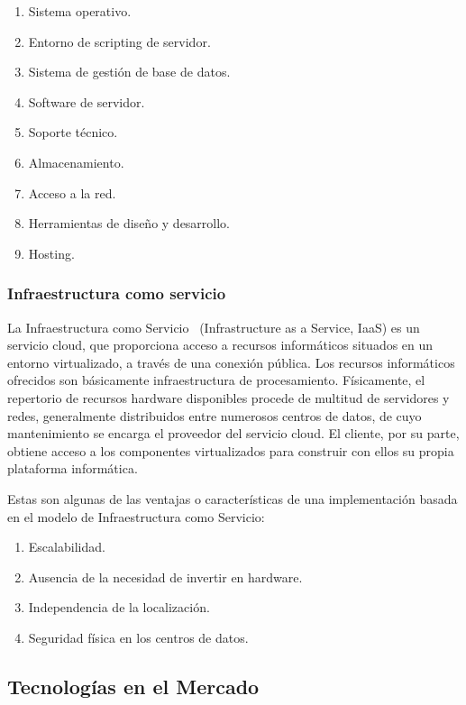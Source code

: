 \documentclass[a4paper,11pt]{book}
\begin{document}
\begin{enumerate}
\item Sistema operativo.
\item Entorno de scripting de servidor.
\item Sistema de gestión de base de datos.
\item Software de servidor.
\item Soporte técnico.
\item Almacenamiento.
\item Acceso a la red.
\item Herramientas de diseño y desarrollo.
\item Hosting.
\end{enumerate}

\subsubsection{Infraestructura como servicio}

La Infraestructura como Servicio~\cite{iaas} (Infrastructure as a Service, IaaS) es un servicio cloud, que proporciona acceso a recursos informáticos situados en un entorno virtualizado, a través de una conexión pública. Los recursos informáticos ofrecidos  son básicamente infraestructura de procesamiento. Físicamente, el repertorio de recursos hardware disponibles procede de multitud de servidores y redes, generalmente distribuidos entre numerosos centros de datos, de cuyo mantenimiento se encarga el proveedor del servicio cloud. El cliente, por su parte, obtiene acceso a los componentes virtualizados para construir con ellos su propia plataforma informática.

Estas son algunas de las ventajas o características de una implementación basada en el modelo de Infraestructura como Servicio:

\begin{enumerate}
\item Escalabilidad.
\item Ausencia de la necesidad de invertir en hardware.
\item Independencia de la localización.
\item Seguridad física en los centros de datos.
\end{enumerate}

\subsection{Tecnologías en el Mercado}\label{mercado}
\end{document}
